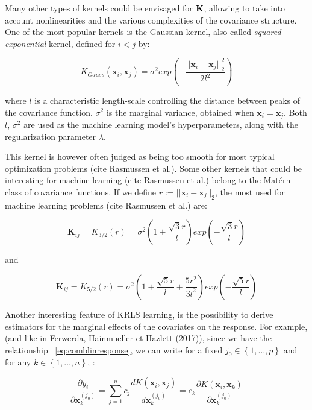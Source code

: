 \medskip

Many other types of kernels could be envisaged for ${\bf K}$, allowing to take into account nonlinearities and the various complexities of the covariance structure. One of the most popular kernels is the Gaussian kernel, also called \textit{squared exponential} kernel, defined for $i < j$ by:

\medskip

$$
K_{Gauss}(\textbf{x}_i, \textbf{x}_j) = \sigma^2 exp \left( -\frac{||\textbf{x}_i - \textbf{x}_j||^2_2}{2l^2} \right)
$$

where $l$ is a characteristic length-scale controlling the distance between peaks of the covariance function. $\sigma^2$ is the marginal variance, obtained when $\textbf{x}_i = \textbf{x}_j$. Both $l$, $\sigma^2$ are used as the machine learning model's hyperparameters, along with the regularization parameter $\lambda$.

\medskip

This kernel is however often judged as being too smooth for most typical optimization problems (cite Rasmussen et al.). Some other kernels that could be interesting for machine learning (cite Rasmussen et al.) belong to the Mat\'ern class of covariance functions. If we define $r := ||\textbf{x}_i - \textbf{x}_j||_2$, the most used for machine learning problems (cite Rasmussen et al.) are:

$$
\textbf{K}_{ij} = K_{3/2}(r) = \sigma^2 \left( 1 + \frac{\sqrt{3}r}{l} \right) exp \left( - \frac{\sqrt{3}r}{l} \right)
$$

and

$$
\textbf{K}_{ij} = K_{5/2}(r) = \sigma^2 \left( 1 + \frac{\sqrt{5}r}{l} + \frac{5 r^2}{3 l^2} \right) exp \left( - \frac{\sqrt{5}r}{l} \right)
$$


\medskip

Another interesting feature of KRLS learning, is the possibility to derive estimators for the  marginal effects of the covariates on the response. For example, (and like in Ferwerda, Hainmueller et Hazlett (2017)), since we have the relationship ~\ref{eq:comblinresponse}, we can write for a fixed $j_0 \in \left \lbrace 1, \ldots, p \right \rbrace$ and for any $k \in \left \lbrace 1, \ldots, n \right \rbrace $, :

\begin{equation}
\frac{\partial y_i}{\partial \textbf{x}_k^{(j_0)}} = \sum_{j = 1}^n c_j \frac{d K(\textbf{x}_i, \textbf{x}_j)}{d \textbf{x}_k^{(j_0)}} = c_k \frac{\partial K(\textbf{x}_i, \textbf{x}_k)}{\partial \textbf{x}_k^{(j_0)}}
\end{equation}

